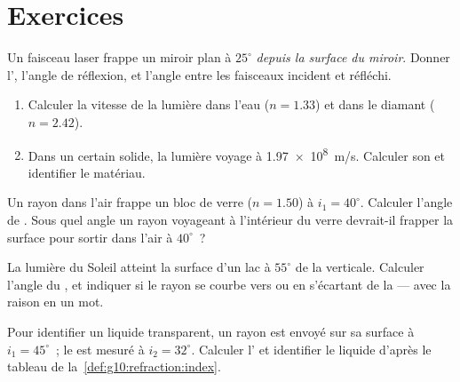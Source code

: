 \section{Exercices}

\begin{exercise}[$\star$]\label{exo:g10:refraction:1}
Un faisceau laser frappe un miroir plan à $25^\circ$ \emph{depuis la
surface du miroir}. Donner l', l'angle de
réflexion, et l'angle entre les faisceaux incident et réfléchi.
\end{exercise}

\begin{exercise}[$\star$]\label{exo:g10:refraction:2}
\begin{enumerate}
  \item Calculer la vitesse de la lumière dans l'eau ($n = 1.33$) et
        dans le diamant ($n = 2.42$).
  \item Dans un certain solide, la lumière voyage à \qty{1.97e8}{m/s}.
        Calculer son  et identifier le matériau.
\end{enumerate}
\end{exercise}

\begin{exercise}[$\star$]\label{exo:g10:refraction:3}
Un rayon dans l'air frappe un bloc de verre ($n = 1.50$) à
$i_1 = 40^\circ$. Calculer l'angle de . Sous quel angle un
rayon voyageant à l'intérieur du verre devrait-il frapper la surface
pour sortir dans l'air à $40^\circ$~?
\end{exercise}

\begin{exercise}[$\star$]\label{exo:g10:refraction:4}
La lumière du Soleil atteint la surface d'un lac à $55^\circ$ de la
verticale. Calculer l'angle du , et indiquer si le
rayon se courbe vers ou en s'écartant de la  --- avec la
raison en un mot.
\end{exercise}

\begin{exercise}[$\star$]\label{exo:g10:refraction:5}
Pour identifier un liquide transparent, un rayon est envoyé sur sa
surface à $i_1 = 45^\circ$~; le  est mesuré à
$i_2 = 32^\circ$. Calculer l' et identifier le
liquide d'après le tableau de la~\cref{def:g10:refraction:index}.
\end{exercise}

